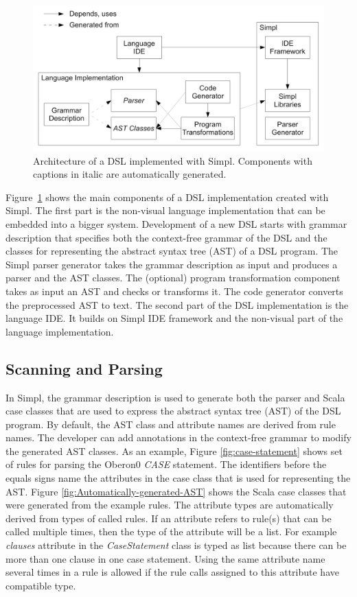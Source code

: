 %
\begin{figure}[!h]
\begin{centering}
\includegraphics[width=0.7\columnwidth]{simpl/architecture}
\par\end{centering}

\caption{\label{fig:architecture}Architecture of a DSL implemented with Simpl.
Components with captions in italic are automatically generated.}

\end{figure}


Figure~\ref{fig:architecture} shows the main components of a DSL
implementation created with Simpl. The first part is the non-visual
language implementation that can be embedded into a bigger system.
Development of a new DSL starts with grammar description that specifies
both the context-free grammar of the DSL and the classes for representing
the abstract syntax tree (AST) of a DSL program. The Simpl parser
generator takes the grammar description as input and produces a parser
and the AST classes. The (optional) program transformation component
takes as input an AST and checks or transforms it. The code generator
converts the preprocessed AST to text. The second part of the DSL
implementation is the language IDE. It builds on Simpl IDE framework
and the non-visual part of the language implementation.


\subsection{Scanning and Parsing}

In Simpl, the grammar description is used to generate both the parser
and Scala case classes that are used to express the abstract syntax
tree (AST) of the DSL program. By default, the AST class and attribute
names are derived from rule names. The developer can add annotations
in the context-free grammar to modify the generated AST classes. As
an example, Figure \ref{fig:case-statement} shows set of rules for
parsing the Oberon0 \emph{CASE} statement. The identifiers before
the equals signs name the attributes in the case class that is used
for representing the AST. Figure \ref{fig:Automatically-generated-AST}
shows the Scala case classes that were generated from the example
rules. The attribute types are automatically derived from types of
called rules. If an attribute refers to rule(s) that can be called
multiple times, then the type of the attribute will be a list. For
example \emph{clauses} attribute in the \emph{CaseStatement} class
is typed as list because there can be more than one clause in one
case statement. Using the same attribute name several times in a rule
is allowed if the rule calls assigned to this attribute have compatible
type.

